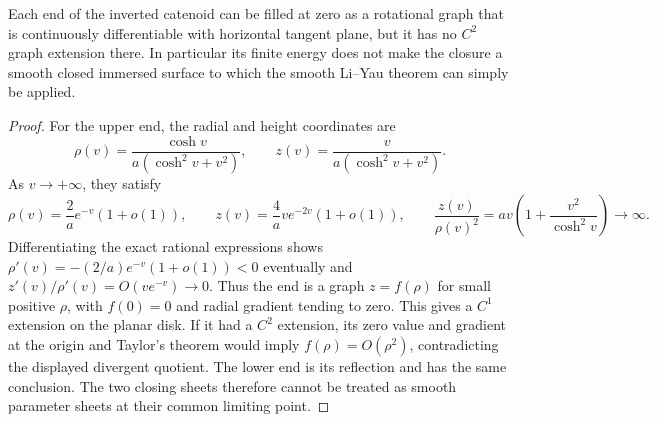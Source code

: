 \begin{proposition}\label{prop:inverted-catenoid-not-c2}
Each end of the inverted catenoid can be filled at zero as a rotational graph that is continuously differentiable with horizontal tangent plane, but it has no $C^2$ graph extension there. In particular its finite energy does not make the closure a smooth closed immersed surface to which the smooth Li--Yau theorem can simply be applied.
\end{proposition}
\begin{proof}
For the upper end, the radial and height coordinates are
\[
 \rho(v)=\frac{\cosh v}{a(\cosh^2v+v^2)},\qquad
 z(v)=\frac{v}{a(\cosh^2v+v^2)}.
\]
As $v\to+\infty$, they satisfy
\[
 \rho(v)=\frac2a e^{-v}(1+o(1)),\qquad
 z(v)=\frac4a v e^{-2v}(1+o(1)),
 \qquad \frac{z(v)}{\rho(v)^2}=av\left(1+\frac{v^2}{\cosh^2v}\right)\longrightarrow\infty.
\]
Differentiating the exact rational expressions shows $\rho'(v)=-(2/a)e^{-v}(1+o(1))<0$ eventually and $z'(v)/\rho'(v)=O(ve^{-v})\to0$. Thus the end is a graph $z=f(\rho)$ for small positive $\rho$, with $f(0)=0$ and radial gradient tending to zero. This gives a $C^1$ extension on the planar disk. If it had a $C^2$ extension, its zero value and gradient at the origin and Taylor's theorem would imply $f(\rho)=O(\rho^2)$, contradicting the displayed divergent quotient. The lower end is its reflection and has the same conclusion. The two closing sheets therefore cannot be treated as smooth parameter sheets at their common limiting point.
\end{proof}
